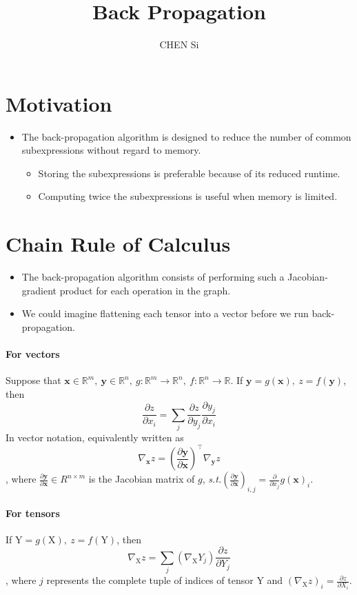 \documentclass[12pt, a4paper]{article}
\title{Back Propagation}
\author{CHEN Si}
\date{}
\def\vx{\boldsymbol{x}}
\def\vy{\boldsymbol{y}}
\def\vrmX{\boldsymbol{\mathrm{X}}}
\def\vrmY{\boldsymbol{\mathrm{Y}}}
\def\R{\mathbb{R}}
\def\st{\textit{s.t.}}
\newcommand{\pard}[2]{\frac{\partial #1}{\partial #2}}
\begin{document}
 


\maketitle
\tableofcontents


\section{Motivation}
\begin{itemize}
    \item The back-propagation algorithm is designed to reduce the number of common subexpressions without regard to memory.
    \begin{itemize}
        \item Storing the subexpressions is preferable because of its reduced runtime.
        \item Computing twice the subexpressions is useful when memory is limited.
    \end{itemize}
\end{itemize}


\section{Chain Rule of Calculus}
\begin{itemize}
    \item The back-propagation algorithm consists of performing such a Jacobian-gradient product for each operation in the graph.
    \item We could imagine flattening each tensor into a vector before we run back-propagation.
\end{itemize}

\paragraph{For vectors}
Suppose that $\vx \in \R^m,\ \vy \in \R^n,\ g: \R^m \to \R^n,\ f: \R^n \to \R$.
If $\vy = g(\vx),\ z = f(\vy)$, then
\[
    \pard{z}{x_i} = \sum_j \pard{z}{y_j} \pard{y_j}{x_i}
\]
In vector notation, equivalently written as
\[
    \nabla_{\vx} z = \left( \pard{\vy}{\vx} \right)^\top \nabla_{\vy} z
\]
, where $\pard{\vy}{\vx} \in R^{n\times m}$ is the Jacobian matrix of $g$, \st $\left( \pard{\vy}{\vx} \right)_{i,j} = \pard{}{x_j} g(\vx)_i$.

\paragraph{For tensors}
If $\vrmY = g(\vrmX),\ z = f(\vrmY)$, then 
\[
    \nabla_{\vrmX}z = \sum_j (\nabla_{\vrmX}Y_j) \pard{z}{Y_j}
\]
, where $j$ represents the complete tuple of indices of tensor $\vrmY$ and $(\nabla_{\vrmX}z)_i = \pard{z}{X_i}$.
\end{document}
